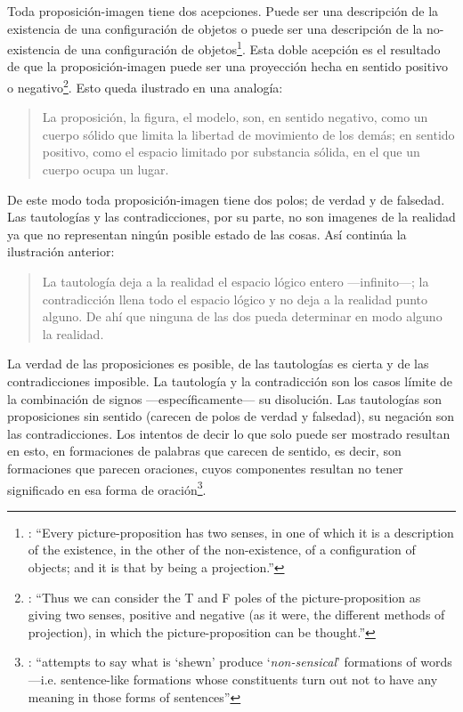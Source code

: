 Toda proposición-imagen tiene dos acepciones. Puede ser una descripción de la existencia de una configuración de objetos o puede ser una descripción de la no-existencia de una configuración de objetos\footnote{\cite[Cf.~][72]{anscombe1959iwt}: \enquote{Every picture-proposition has two senses, in one of which it is a description of the existence, in the other of the non-existence, of a configuration of objects; and it is that by being a projection.}}. Esta doble acepción es el resultado de que la proposición-imagen puede ser una proyección hecha en sentido positivo o negativo\footnote{\cite[Cf.~][74]{anscombe1959iwt}: \enquote{Thus we can consider the T and F poles of the picture-proposition as giving two senses, positive and negative (as it were, the different methods of projection), in which the picture-proposition can be thought.}}. Esto queda ilustrado en una analogía: \blockquote[{\cite[\S4.463]{wittgenstein1922tractatuses}}]{La proposición, la figura, el modelo, son, en sentido negativo, como un cuerpo sólido que limita la libertad de movimiento de los demás; en sentido positivo, como el espacio limitado por substancia sólida, en el que un cuerpo ocupa un lugar.}

De este modo toda proposición-imagen tiene dos polos; de verdad y de falsedad. Las tautologías y las contradicciones, por su parte, no son imagenes de la realidad ya que no representan ningún posible estado de las cosas. Así continúa la ilustración anterior:
\blockquote[{\cite[\S4.463]{wittgenstein1922tractatuses}}]{La tautología deja a la realidad el espacio lógico entero ---infinito---; la contradicción llena todo el espacio lógico y no deja a la realidad punto alguno. De ahí que ninguna de las dos pueda determinar en modo alguno la realidad.}

La verdad de las proposiciones es posible, de las tautologías es cierta y de las contradicciones imposible. La tautología y la contradicción son los casos límite de la combinación de signos ---específicamente--- su disolución.\autocite[Cf.~][\S4.464 y \S4.466]{wittgenstein1922tractatuses} Las tautologías son proposiciones sin sentido (carecen de polos de verdad y falsedad), su negación son las contradicciones. Los intentos de decir lo que solo puede ser mostrado resultan en esto, en formaciones de palabras que carecen de sentido, es decir, son formaciones que parecen oraciones, cuyos componentes resultan no tener significado en esa forma de oración\footnote{\cite[Cf.~][163]{anscombe1959iwt}: \enquote{attempts to say what is `shewn' produce `\emph{non-sensical}' formations of words---i.e. sentence-like formations whose constituents turn out not to have any meaning in those forms of sentences}}.

